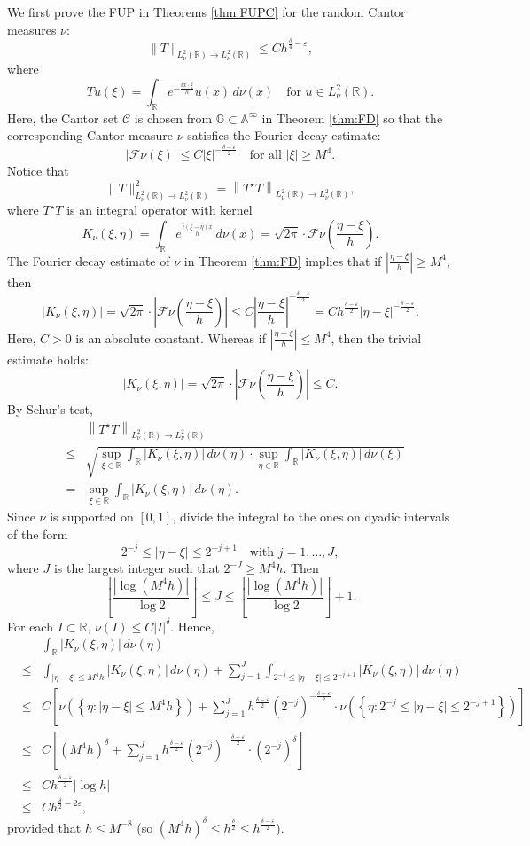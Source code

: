\documentclass[12pt,reqno]{amsart}
\newcommand\Ab{\mathbb{A}}
\newcommand\Cc{\mathcal{C}}
\newcommand\Fc{\mathcal{F}}
\newcommand\Gb{\mathbb{G}}
\newcommand\R{\mathbb{R}}
\newcommand\ve{\varepsilon}
\theoremstyle{plain}
\theoremstyle{remark}
\numberwithin{equation}{section}
\begin{document}
We first prove the FUP in Theorems \ref{thm:FUPC} for the random Cantor measures $\nu$:
$$\|T\|_{L^2_\nu(\R)\to L^2_\nu(\R)}\le Ch^{\frac\delta4-\ve},$$
where
$$Tu(\xi)=\int_{\R}e^{-\frac{ix\cdot \xi}{h}}u(x)\,d\nu(x)\quad\text{for }u\in L^2_\nu(\R).$$
Here, the Cantor set $\Cc$ is chosen from $\Gb\subset\Ab^\infty$ in Theorem \ref{thm:FD} so that the corresponding Cantor measure $\nu$ satisfies the Fourier decay estimate:
$$|\Fc\nu(\xi)|\le C|\xi|^{-\frac{\delta-\ve}{2}}\quad\text{for all }|\xi|\ge M^4.$$
Notice that
$$\|T\|_{L^2_\nu(\R)\to L^2_\nu(\R)}^2=\left\|T^\star T\right\|_{L^2_\nu(\R)\to L^2_\nu(\R)},$$
where $T^\star T$ is an integral operator with kernel
$$K_\nu(\xi,\eta)=\int_\R e^{\frac{i(\xi-\eta)x}{h}}\,d\nu(x)=\sqrt{2\pi}\cdot\Fc\nu\left(\frac{\eta-\xi}{h}\right).$$
The Fourier decay estimate of $\nu$ in Theorem \ref{thm:FD} implies that if $|\frac{\eta-\xi}{h}|\ge M^4$, then
$$\left|K_\nu(\xi,\eta)\right|=\sqrt{2\pi}\cdot\left|\Fc\nu\left(\frac{\eta-\xi}{h}\right)\right|\le C\left|\frac{\eta-\xi}{h}\right|^{-\frac{\delta-\ve}{2}}=Ch^{\frac{\delta-\ve}{2}}|\eta-\xi|^{-\frac{\delta-\ve}{2}}.$$
Here, $C>0$ is an absolute constant. Whereas if $|\frac{\eta-\xi}{h}|\le M^4$, then the trivial estimate holds:
$$\left|K_\nu(\xi,\eta)\right|=\sqrt{2\pi}\cdot\left|\Fc\nu\left(\frac{\eta-\xi}{h}\right)\right|\le C.$$
By Schur's test,
\begin{eqnarray*}
&&\left\|T^\star T\right\|_{L^2_\nu(\R)\to L^2_\nu(\R)}\\
&\le&\sqrt{\sup_{\xi\in\R}\int_{\R}\left|K_\nu(\xi,\eta)\right|\,d\nu(\eta)\cdot\sup_{\eta\in\R}\int_{\R}\left|K_\nu(\xi,\eta)\right|\,d\nu(\xi)}\\
&=&\sup_{\xi\in\R}\int_\R\left|K_\nu(\xi,\eta)\right|\,d\nu(\eta).
\end{eqnarray*}
Since $\nu$ is supported on $[0,1]$, divide the integral to the ones on dyadic intervals of the form
$$2^{-j}\le|\eta-\xi|\le2^{-j+1}\quad\text{with }j=1,...,J,$$
where $J$ is the largest integer such that $2^{-J}\ge M^4h$. Then
$$\left\lfloor\frac{\left|\log\left(M^4h\right)\right|}{\log2}\right\rfloor\le J\le\left\lfloor\frac{\left|\log\left(M^4h\right)\right|}{\log2}\right\rfloor+1.$$
For each $I\subset\R$, $\nu(I)\le C|I|^\delta$. Hence,
\begin{eqnarray*}
&&\int_\R\left|K_\nu(\xi,\eta)\right|\,d\nu(\eta)\\
&\le&\int_{|\eta-\xi|\le M^4h}\left|K_\nu(\xi,\eta)\right|\,d\nu(\eta)+\sum_{j=1}^J\int_{2^{-j}\le|\eta-\xi|\le2^{-j+1}}\left|K_\nu(\xi,\eta)\right|\,d\nu(\eta)\\
&\le&C\left[\nu\left(\left\{\eta:|\eta-\xi|\le M^4h\right\}\right)+\sum_{j=1}^Jh^{\frac{\delta-\ve}{2}}\left(2^{-j}\right)^{-\frac{\delta-\ve}{2}}\cdot\nu\left(\left\{\eta:2^{-j}\le|\eta-\xi|\le2^{-j+1}\right\}\right)\right]\\
&\le&C\left[\left(M^4h\right)^\delta+\sum_{j=1}^Jh^{\frac{\delta-\ve}{2}}\left(2^{-j}\right)^{-\frac{\delta-\ve}{2}}\cdot\left(2^{-j}\right)^\delta\right]\\
&\le&Ch^{\frac{\delta-\ve}{2}}|\log h|\\
&\le&Ch^{\frac\delta2-2\ve},
\end{eqnarray*}
provided that $h\le M^{-8}$ (so $(M^4h)^\delta\le h^\frac\delta2\le h^{\frac{\delta-\ve}{2}}$).
\end{document}
